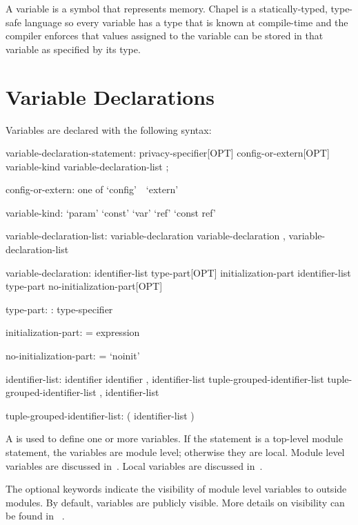 \label{Variables}

A variable is a symbol that represents memory.  Chapel is a
statically-typed, type-safe language so every variable has a type that
is known at compile-time and the compiler enforces that values
assigned to the variable can be stored in that variable as specified
by its type.

\section{Variable Declarations}
\label{Variable_Declarations}

Variables are declared with the following syntax:
\begin{syntax}
variable-declaration-statement:
  privacy-specifier[OPT] config-or-extern[OPT] variable-kind variable-declaration-list ;

config-or-extern: one of
  `config' $ $ $ $ `extern'

variable-kind:
  `param'
  `const'
  `var'
  `ref'
  `const ref'

variable-declaration-list:
  variable-declaration
  variable-declaration , variable-declaration-list

variable-declaration:
  identifier-list type-part[OPT] initialization-part
  identifier-list type-part no-initialization-part[OPT]

type-part:
  : type-specifier

initialization-part:
  = expression

no-initialization-part:
  = `noinit'

identifier-list:
  identifier
  identifier , identifier-list
  tuple-grouped-identifier-list
  tuple-grouped-identifier-list , identifier-list

tuple-grouped-identifier-list:
  ( identifier-list )
\end{syntax}
A  is used to define one or more
variables.  If the statement is a top-level module statement, the
variables are module level; otherwise they are local.  Module level variables are
discussed in~.  Local variables are discussed
in~.

The optional  keywords indicate the visibility
of module level variables to outside modules.  By default, variables
are publicly visible.  More details on visibility can be found in
~.

